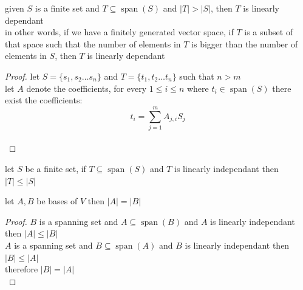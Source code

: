 \documentclass[a4paper,12pt]{article}
\DeclareMathOperator{\spn}{span}
\begin{document}
\begin{definition}
\begin{lemma}
given \(S\) is a finite set and \(T \subseteq \spn(S)\) and \(|T| > |S|\), then \(T\) is linearly dependant\\
in other words, if we have a finitely generated vector space, if \(T\) is a subset of that space such that the number of elements in \(T\) is bigger than the number of elements in \(S\), then \(T\) is linearly dependant\\
\begin{proof}
let \(S = \{s_1,s_2 \ldots s_n\}\) and \(T = \{t_1,t_2 \ldots t_n\}\) such that \(n > m\)\\
let \(A\) denote the coefficients, for every \(1 \leq i \leq n\) where \(t_i \in \spn(S)\) there exist the coefficients:\\
\[
  t_i = \sum_{j=1}^{m} A_{j,i} S_j
\]\\
\end{proof}
\begin{entailment}
let \(S\) be a finite set, if \(T \subseteq \spn(S)\) and \(T\) is linearly independant then \(|T| \leq |S|\)\\
\end{entailment}
\begin{entailment}
let \(A,B\) be bases of \(V\) then \(|A| = |B|\)\\
\begin{proof}
\(B\) is a spanning set and \(A \subseteq \spn(B)\) and \(A\) is linearly independant then \(|A| \leq |B|\)\\
\(A\) is a spanning set and \(B \subseteq \spn(A)\) and \(B\) is linearly independant then \(|B| \leq |A|\)\\
therefore \(|B| = |A|\)\\
\end{proof}
\end{entailment}
\end{lemma}
\end{definition}
\end{document}

